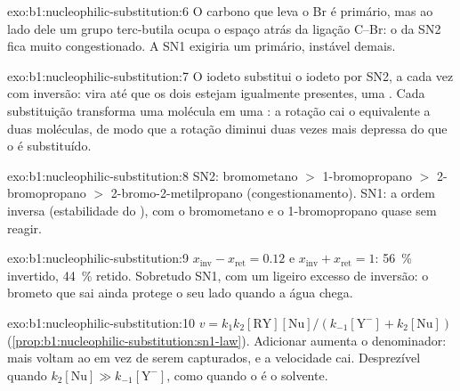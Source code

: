 \begin{solution}{exo:b1:nucleophilic-substitution:6}
O carbono que leva o Br é primário, mas ao lado dele um grupo terc-butila
ocupa o espaço atrás da ligação C--Br: o  da SN2 fica
muito congestionado. A SN1 exigiria um  primário, instável
demais.
\end{solution}

\begin{solution}{exo:b1:nucleophilic-substitution:7}
O iodeto substitui o iodeto por SN2, a cada vez com inversão: 
vira  até que os dois estejam igualmente presentes, uma . Cada substituição transforma uma molécula  em uma
: a rotação cai o equivalente a duas moléculas, de modo que a
rotação diminui duas vezes mais depressa do que o  é
substituído.
\end{solution}

\begin{solution}{exo:b1:nucleophilic-substitution:8}
SN2: bromometano $>$ 1-bromopropano $>$ 2-bromopropano $>$
2-bromo-2-metilpropano (congestionamento). SN1: a ordem inversa
(estabilidade do ), com o bromometano e o 1-bromopropano quase
sem reagir.
\end{solution}

\begin{solution}{exo:b1:nucleophilic-substitution:9}
$x_{\text{inv}} - x_{\text{ret}} = 0.12$ e $x_{\text{inv}} + x_{\text{ret}} = 1$:
\qty{56}{\percent} invertido, \qty{44}{\percent} retido. Sobretudo
 SN1, com um ligeiro excesso de inversão: o brometo que sai
ainda protege o seu lado quando a água chega.
\end{solution}

\begin{solution}{exo:b1:nucleophilic-substitution:10}
$v = k_1k_2[\mathrm{RY}][\mathrm{Nu}]/(k_{-1}[\mathrm{Y^-}] + k_2[\mathrm{Nu}])$
(\cref{prop:b1:nucleophilic-substitution:sn1-law}). Adicionar 
aumenta o denominador: mais  voltam ao  em vez de
serem capturados, e a velocidade cai. Desprezível quando
$k_2[\mathrm{Nu}] \gg k_{-1}[\mathrm{Y^-}]$, como quando o  é o
solvente.
\end{solution}


